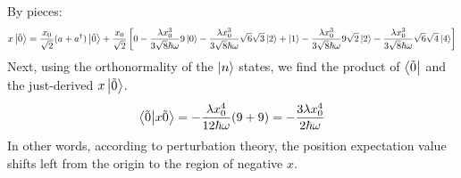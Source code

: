 \documentclass[11pt, a4paper]{article}
\renewcommand{\t}[1]{\tilde{#1}}
\begin{document}
\begin{itemize}
	By pieces:
	\begin{equation*}
		x\ket{\t{0}} = \frac{x_{0}}{\sqrt{2}}(a + a^{\dagger})\ket{\t{0}} + \frac{x_{0}}{\sqrt{2}} \left[0 - \frac{\lambda x_{0}^{3}}{3 \sqrt{8}\hbar \omega} 9 \ket{0} - \frac{\lambda x_{0}^{3}}{3 \sqrt{8}\hbar \omega} \sqrt{6} \sqrt{3}\ket{2} + \ket{1} - \frac{\lambda x_{0}^{3}}{3 \sqrt{8}\hbar \omega}9 \sqrt{2}\ket{2} - \frac{\lambda x_{0}^{3}}{3 \sqrt{8}\hbar \omega}\sqrt{6}\sqrt{4}\ket{4}\right]
	\end{equation*}
	Next, using the orthonormality of the $ \ket{n} $ states, we find the product of $ \bra{\t{0}} $ and the just-derived $ x\ket{\t{0}} $.
	\begin{equation*}
		\braket{\t{0}}{x\t{0}} = -\frac{\lambda x_{0}^{4}}{12 \hbar \omega}(9 + 9) = -\frac{3\lambda x_{0}^{4}}{2 \hbar \omega}
	\end{equation*}
	In other words, according to perturbation theory, the position expectation value shifts left from the origin to the region of negative $ x $.
	

	
\end{itemize}
\fi
\end{document}

